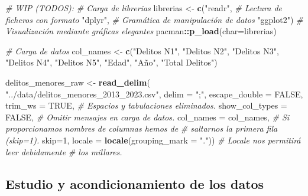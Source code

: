 \documentclass[,,,,pdftex]{Definitions/mdpi}
\newenvironment{Shaded}{\begin{snugshade}}{\end{snugshade}}
\newcommand{\AttributeTok}[1]{\textcolor[rgb]{0.13,0.29,0.53}{#1}}
\newcommand{\CommentTok}[1]{\textcolor[rgb]{0.56,0.35,0.01}{\textit{#1}}}
\newcommand{\ConstantTok}[1]{\textcolor[rgb]{0.56,0.35,0.01}{#1}}
\newcommand{\DecValTok}[1]{\textcolor[rgb]{0.00,0.00,0.81}{#1}}
\newcommand{\FunctionTok}[1]{\textcolor[rgb]{0.13,0.29,0.53}{\textbf{#1}}}
\newcommand{\NormalTok}[1]{#1}
\newcommand{\OtherTok}[1]{\textcolor[rgb]{0.56,0.35,0.01}{#1}}
\newcommand{\SpecialCharTok}[1]{\textcolor[rgb]{0.81,0.36,0.00}{\textbf{#1}}}
\newcommand{\StringTok}[1]{\textcolor[rgb]{0.31,0.60,0.02}{#1}}
\begin{document}
\begin{Shaded}
\begin{Highlighting}[]
\CommentTok{\# WIP (TODOS):}
\CommentTok{\# Carga de librerias}
\NormalTok{librerias }\OtherTok{\textless{}{-}} \FunctionTok{c}\NormalTok{(}\StringTok{"readr"}\NormalTok{,       }\CommentTok{\# Lectura de ficheros con formato}
               \StringTok{"dplyr"}\NormalTok{,       }\CommentTok{\# Gramática de manipulación de datos}
               \StringTok{"ggplot2"}\NormalTok{)     }\CommentTok{\# Visualización mediante gráficas elegantes}
\NormalTok{pacman}\SpecialCharTok{::}\FunctionTok{p\_load}\NormalTok{(}\AttributeTok{char=}\NormalTok{librerias)}

\CommentTok{\# Carga de datos}
\NormalTok{col\_names }\OtherTok{\textless{}{-}} \FunctionTok{c}\NormalTok{(}\StringTok{"Delitos N1"}\NormalTok{, }\StringTok{"Delitos N2"}\NormalTok{, }\StringTok{"Delitos N3"}\NormalTok{,}
               \StringTok{"Delitos N4"}\NormalTok{, }\StringTok{"Delitos N5"}\NormalTok{, }\StringTok{"Edad"}\NormalTok{,}
               \StringTok{"Año"}\NormalTok{, }\StringTok{"Total Delitos"}\NormalTok{)}

\NormalTok{delitos\_menores\_raw }\OtherTok{\textless{}{-}} \FunctionTok{read\_delim}\NormalTok{(}
  \StringTok{"../data/delitos\_menores\_2013\_2023.csv"}\NormalTok{, }
  \AttributeTok{delim =} \StringTok{";"}\NormalTok{,}
  \AttributeTok{escape\_double =} \ConstantTok{FALSE}\NormalTok{,}
  \AttributeTok{trim\_ws =} \ConstantTok{TRUE}\NormalTok{,                        }\CommentTok{\# Espacios y tabulaciones eliminados.}
  \AttributeTok{show\_col\_types =} \ConstantTok{FALSE}\NormalTok{,                }\CommentTok{\# Omitir mensajes en carga de datos.}
  \AttributeTok{col\_names =}\NormalTok{ col\_names,                 }\CommentTok{\# Si proporcionamos nombres de columnas hemos de}
                                         \CommentTok{\# saltarnos la primera fila (skip=1).}
  \AttributeTok{skip=}\DecValTok{1}\NormalTok{,}
  \AttributeTok{locale =} \FunctionTok{locale}\NormalTok{(}\AttributeTok{grouping\_mark =} \StringTok{"."}\NormalTok{))  }\CommentTok{\# Locale nos permitirá leer debidamente}
                                         \CommentTok{\# los millares.}
\end{Highlighting}
\end{Shaded}

\subsection{Estudio y acondicionamiento de los
datos}\label{estudio-y-acondicionamiento-de-los-datos}
\end{document}
